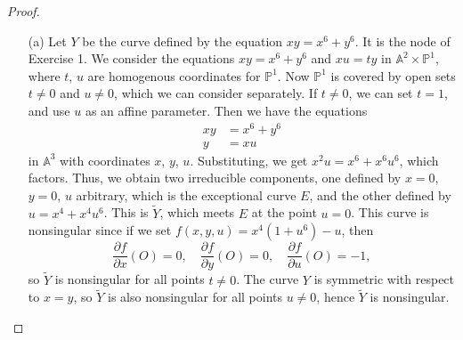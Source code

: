 \documentclass[12pt]{article}
\newcommand{\pd}[2]{\frac{\partial #1}{\partial #2}}
\newcommand{\A}{\mathbb{A}}
\newcommand{\PP}{\mathbb{P}}
\theoremstyle{definition}
\begin{document}
\begin{enumerate} [label=\textbf{\arabic*.}, leftmargin=-0.05em]
\begin{proof} $ $ \vspace{0pt}
    \begin{itemize}
        \item[(a)] Let $Y$ be the curve defined by the equation $xy = x^6 + y^6$. It is the node of Exercise 1. We consider the equations $xy = x^6 + y^6$ and $xu = ty$ in $\A^2 \times \PP^1$, where $t$, $u$ are homogenous coordinates for $\PP^1$. Now $\PP^1$ is covered by open sets $t \neq 0$ and $u \neq 0$, which we can consider separately. If $t \neq 0$, we can set $t = 1$, and use $u$ as an affine parameter. Then we have the equations
        \begin{align*}
            xy & = x^6 + y^6 \\
            y & = xu
        \end{align*}
        in $\A^3$ with coordinates $x$, $y$, $u$. Substituting, we get $x^2 u = x^6 + x^6 u^6$, which factors. Thus, we obtain two irreducible components, one defined by $x = 0$, $y = 0$, $u$ arbitrary, which is the exceptional curve $E$, and the other defined by $u = x^4 + x^4 u^6$. This is $\tilde{Y}$, which meets $E$ at the point $u = 0$. This curve is nonsingular since if we set $f(x, y, u) = x^4(1 + u^6) - u$, then
        \begin{equation*}
            \pd{f}{x}(O) = 0, \quad \pd{f}{y}(O) = 0, \quad \pd{f}{u}(O) = -1,
        \end{equation*}
        so $\tilde{Y}$ is nonsingular for all points $t \neq 0$. The curve $Y$ is symmetric with respect to $x = y$, so $\tilde{Y}$ is also nonsingular for all points $u \neq 0$, hence $\tilde{Y}$ is nonsingular.


\end{itemize}
\end{proof}
\end{enumerate}
\end{document}
